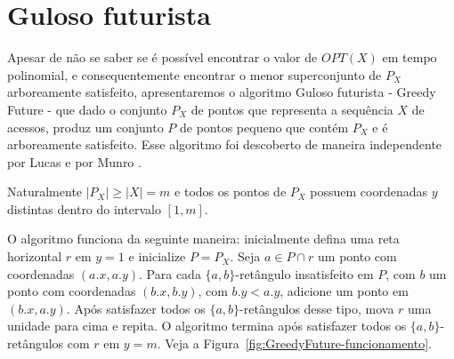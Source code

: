 \section{Guloso futurista}

Apesar de não se saber se é possível encontrar o valor de $OPT(X)$ em tempo polinomial, e consequentemente encontrar o menor superconjunto de $P_X$ arboreamente satisfeito, apresentaremos o algoritmo Guloso futurista - Greedy Future - que dado o conjunto $P_X$ de pontos que representa a sequência $X$ de acessos, produz um conjunto $P$ de pontos pequeno que contém $P_X$ e é arboreamente satisfeito. Esse algoritmo foi descoberto de maneira independente por Lucas \cite{lucas} e por Munro \cite{munro}.

Naturalmente $|P_X| \geq |X| = m$ e todos os pontos de $P_X$ possuem coordenadas $y$ distintas dentro do intervalo $[1,m]$. 

O algoritmo funciona da seguinte maneira: inicialmente defina uma reta horizontal $r$ em $y = 1$ e inicialize $P = P_X$. Seja $a \in P \cap r$ um ponto com coordenadas $(a.x, a.y)$. Para cada $\{a,b\}$-retângulo insatisfeito em $P$, com $b$ um ponto com coordenadas $(b.x, b.y)$, com $b.y < a.y$, adicione um ponto em $(b.x, a.y)$. Após satisfazer todos os $\{a,b\}$-retângulos desse tipo, mova $r$ uma unidade para cima e repita. O algoritmo termina após satisfazer todos os $\{a,b\}$-retângulos com $r$ em $y = m$. Veja a Figura~\ref{fig:GreedyFuture-funcionamento}.

